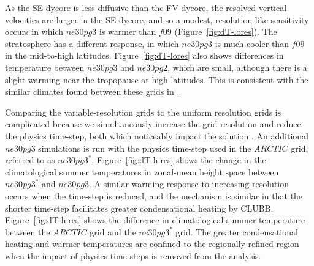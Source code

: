 \documentclass[draft]{agujournal2019}
\begin{document}
As the SE dycore is less diffusive than the FV dycore, the resolved vertical velocities are larger in the SE dycore, and so a modest, resolution-like sensitivity occurs in which $ne30pg3$ is warmer than $f09$ (Figure~\ref{fig:dT-lores}). The stratosphere has a different response, in which $ne30pg3$ is much cooler than $f09$ in the mid-to-high latitudes. Figure~\ref{fig:dT-lores} also shows differences in temperature between $ne30pg3$ and $ne30pg2$, which are small, although there is a slight warming near the tropopause at high latitudes. This is consistent with the similar climates found between these grids in \cite{HETAL2019JAMES}.

Comparing the variable-resolution grids to the uniform resolution grids is complicated because we simultaneously increase the grid resolution and reduce the physics time-step, both which noticeably impact the solution \cite{W2008TELLUS}. An additional $ne30pg3$ simulations is run with the physics time-step used in the $ARCTIC$ grid, referred to as $ne30pg3^{*}$. Figure~\ref{fig:dT-hires} shows the change in the climatological summer temperatures in zonal-mean height space between $ne30pg3^{*}$ and $ne30pg3$. A similar warming response to increasing resolution occurs when the time-step is reduced, and the mechanism is similar in that the shorter time-step facilitates greater condensational heating by CLUBB. Figure~\ref{fig:dT-hires} shows the difference in climatological summer temperature between the $ARCTIC$ grid and the $ne30pg3^{*}$ grid. The greater condensational heating and warmer temperatures are confined to the regionally refined region when the impact of physics time-steps is removed from the analysis.
\end{document}
